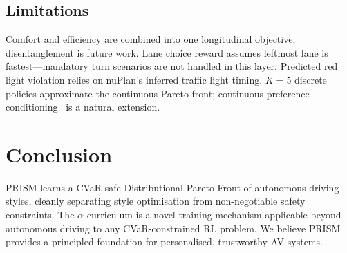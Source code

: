 \documentclass[conference]{IEEEtran}
\begin{document}
\subsection{Limitations}

Comfort and efficiency are combined into one longitudinal objective;
disentanglement is future work. Lane choice reward assumes leftmost
lane is fastest---mandatory turn scenarios are not handled in this
layer. Predicted red light violation relies on nuPlan's inferred
traffic light timing. $K\!=\!5$ discrete policies approximate the
continuous Pareto front; continuous preference
conditioning~\cite{Surmann2025} is a natural extension.

\section{Conclusion}\label{sec:conclusion}

PRISM learns a CVaR-safe Distributional Pareto Front of autonomous
driving styles, cleanly separating style optimisation from
non-negotiable safety constraints. The $\alpha$-curriculum is a
novel training mechanism applicable beyond autonomous driving to
any CVaR-constrained RL problem. We believe PRISM provides a
principled foundation for personalised, trustworthy AV systems.



\end{document}
